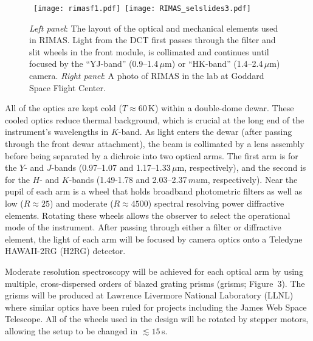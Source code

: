 \documentclass[letterpaper,11pt]{article}
\begin{document}
\begin{figure}[tp!]
\begin{center}
\hbox{
\texttt{[image: rimasf1.pdf]}
\hspace{0.5cm}
\texttt{[image: RIMAS\_selslides3.pdf]}
}
\end{center}
\caption{\footnotesize
{{\it Left panel}: The layout of the optical and mechanical elements used in RIMAS.
Light from the DCT first passes through the filter and slit wheels in the 
front module, is collimated and continues until focused by the ``YJ-band'' 
(0.9--1.4\,$\mu$m) or ``HK-band'' (1.4--2.4\,$\mu$m) camera.
{\it Right panel}: A photo of RIMAS in the lab at Goddard Space Flight Center.}}
\label{fig2}
\end{figure}

All of the optics are kept cold ($T \approx 60$\,K) within a
double-dome dewar. These cooled optics reduce 
thermal background, which is crucial at the long end of the instrument’s 
wavelengths in $K$-band. As light enters the dewar (after passing through the front 
dewar attachment), the beam is collimated by a lens assembly before being separated by a 
dichroic into two optical arms. The first arm is for the $Y$- and $J$-bands 
(0.97--1.07 and 1.17--1.33\,$\mu$m, respectively), and the second is for the $H$- 
and $K$-bands (1.49-1.78 and 2.03--2.37\,$mu$m, respectively). Near the pupil of each 
arm is a wheel that holds broadband photometric filters as well as low ($R \approx
25$) and moderate ($R \approx 4500$) spectral resolving power diffractive elements. 
Rotating these wheels allows the observer to select the operational mode of the 
instrument. After passing through either a filter or diffractive element, the light of 
each arm will be focused by camera optics onto a Teledyne HAWAII-2RG (H2RG) detector.

Moderate resolution spectroscopy will be achieved for each optical arm by using 
multiple, cross-dispersed orders of blazed grating prisms (grisms; Figure~3).  
The grisms will be produced at Lawrence 
Livermore National Laboratory (LLNL) where similar optics have been ruled for projects 
including the James Web Space Telescope.  All of the wheels used in the design will be rotated by stepper motors, allowing the setup to be changed in $\lesssim 15$\,s.
\end{document}

